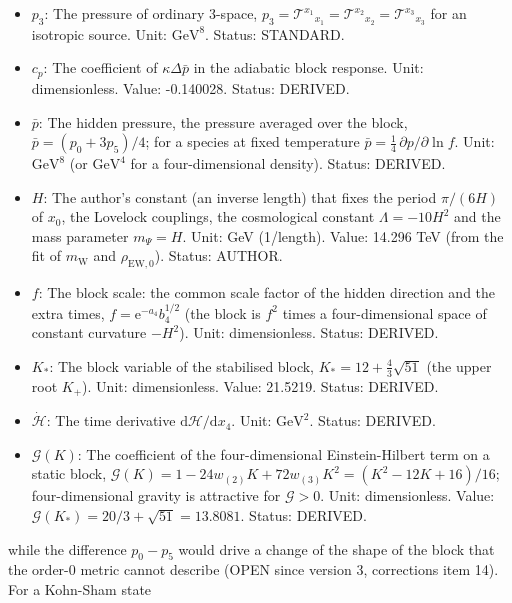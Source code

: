 \documentclass[
  10pt,
]{article}
\begin{document}
\begin{itemize}
  dimensionless. Value: -0.107556. Status: DERIVED.
\item
  \(p_3\): The pressure of ordinary 3-space,
  \(p_3 = \mathcal{T}^{x_1}{}_{x_1} = \mathcal{T}^{x_2}{}_{x_2} = \mathcal{T}^{x_3}{}_{x_3}\)
  for an isotropic source. Unit: \(\mathrm{GeV}^{8}\). Status: STANDARD.
\item
  \(c_p\): The coefficient of \(\kappa\Delta\bar p\) in the adiabatic
  block response. Unit: dimensionless. Value: -0.140028. Status:
  DERIVED.
\item
  \(\bar p\): The hidden pressure, the pressure averaged over the block,
  \(\bar p = (p_0 + 3p_5)/4\); for a species at fixed temperature
  \(\bar p = \frac14\,\partial p/\partial\ln f\). Unit:
  \(\mathrm{GeV}^{8}\) (or \(\mathrm{GeV}^{4}\) for a four-dimensional
  density). Status: DERIVED.
\item
  \(H\): The author's constant (an inverse length) that fixes the period
  \(\pi/(6H)\) of \(x_0\), the Lovelock couplings, the cosmological
  constant \(\Lambda = -10H^2\) and the mass parameter \(m_\Psi = H\).
  Unit: GeV (1/length). Value: 14.296 TeV (from the fit of
  \(m_{\mathrm{W}}\) and \(\rho_{\mathrm{EW},0}\)). Status: AUTHOR.
\item
  \(f\): The block scale: the common scale factor of the hidden
  direction and the extra times, \(f = \mathrm{e}^{-a_4}b_4^{1/2}\) (the
  block is \(f^2\) times a four-dimensional space of constant curvature
  \(-H^2\)). Unit: dimensionless. Status: DERIVED.
\item
  \(K_*\): The block variable of the stabilised block,
  \(K_* = 12 + \frac43\sqrt{51}\) (the upper root \(K_+\)). Unit:
  dimensionless. Value: 21.5219. Status: DERIVED.
\item
  \(\dot{\mathcal{H}}\): The time derivative
  \(\mathrm{d}\mathcal{H}/\mathrm{d}x_4\). Unit: \(\mathrm{GeV}^{2}\).
  Status: DERIVED.
\item
  \(\mathcal{G}(K)\): The coefficient of the four-dimensional
  Einstein-Hilbert term on a static block,
  \(\mathcal{G}(K) = 1 - 24w_{(2)}K + 72w_{(3)}K^2 = (K^2 - 12K + 16)/16\);
  four-dimensional gravity is attractive for \(\mathcal{G} > 0\). Unit:
  dimensionless. Value:
  \(\mathcal{G}(K_*) = 20/3 + \sqrt{51} = 13.8081\). Status: DERIVED.
\end{itemize}

while the difference \(p_0 - p_5\) would drive a change of the shape of
the block that the order-0 metric cannot describe (OPEN since version 3,
corrections item 14). For a Kohn-Sham state
\end{document}
